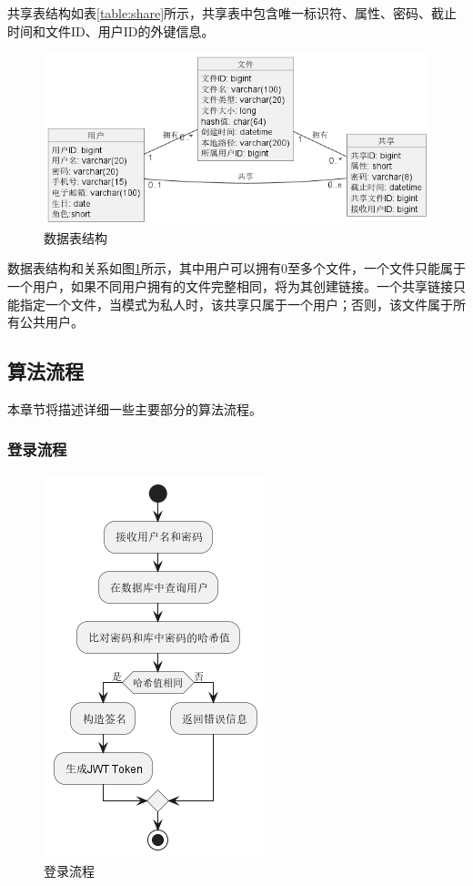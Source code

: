 共享表结构如表\ref{table:share}所示，共享表中包含唯一标识符、属性、密码、截止时间和文件ID、用户ID的外键信息。

\begin{figure}[H]
    \centering
    \includegraphics[scale=0.5]{examples/数据表结构图.png}
    \caption{数据表结构}
    \label{fig:table}
\end{figure}

数据表结构和关系如图\ref{fig:table}所示，其中用户可以拥有0至多个文件，一个文件只能属于一个用户，如果不同用户拥有的文件完整相同，将为其创建链接。一个共享链接只能指定一个文件，当模式为私人时，该共享只属于一个用户；否则，该文件属于所有公共用户。

\subsection{算法流程}

本章节将描述详细一些主要部分的算法流程。

\subsubsection{登录流程}

\begin{figure}[H]
    \centering
    \includegraphics[scale=0.8]{examples/登录流程.png}
    \caption{登录流程}
    \label{fig:login}
\end{figure}

